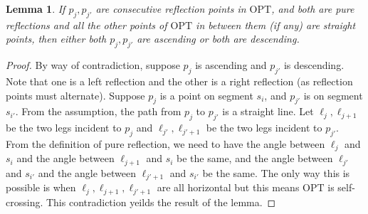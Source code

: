 \documentclass[pdflatex,sn-mathphys-num]{sn-jnl}
\theoremstyle{thmstyleone}
\newtheorem{lemma}{Lemma}
\newcommand{\OPT}{{\text{OPT}}}
\begin{document}
\begin{lemma}\label{lem:cons-ref}
    If $p_j,p_{j'}$ are consecutive reflection points in $\OPT$, and both are pure reflections  and all the other points of $\OPT$ in between them (if any) are straight points, then either both $p_j,p_{j'}$ are ascending or both are descending.
\end{lemma}
\begin{proof}
	By  way  of contradiction, suppose 
	$p_j$ is ascending and $p_{j'}$ is descending. Note that one is a left reflection and the other is a right reflection (as reflection points must alternate). Suppose $p_j$ is a point on segment $s_i$, and $p_{j'}$ is on segment $s_{i'}$. From the assumption, the path  from $p_j$ to $p_{j'}$ is a straight line.
	Let $\ell_j,\ell_{j+1}$ be the two legs incident to $p_j$ and $\ell_{j'},\ell_{j'+1}$ be the two legs incident to $p_{j'}$. From the definition of pure reflection, we need to have the angle between $\ell_j$ and $s_i$ and the angle between $\ell_{j+1}$ and $s_i$ be the same, and the angle between $\ell_{j'}$ and $s_{i'}$ and the angle between $\ell_{j'+1}$ and $s_{i'}$ be the same. The only way this is possible is when 
	$\ell_j,\ell_{j+1},\ell_{j'+1}$ are all horizontal but this means $\OPT$
	is self-crossing. This contradiction yeilds the result of the lemma.
\end{proof}
\end{document}
